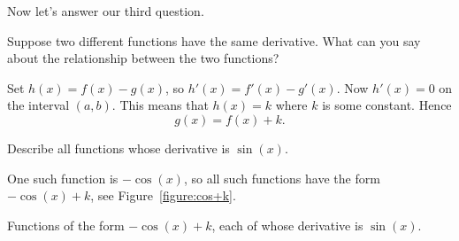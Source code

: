 Now let's answer our third question.

\begin{example}
Suppose two different functions have the same derivative. What can you
say about the relationship between the two functions?
\end{example}

\begin{solution}
Set $h(x) = f(x) - g(x)$, so $h'(x) = f'(x) -g'(x)$. Now $h'(x) = 0$
on the interval $(a,b)$. This means that $h(x) = k$ where $k$ is some
constant. Hence
\[
g(x) = f(x) + k.
\]
\end{solution}


\begin{example}
Describe all functions whose derivative is $\sin(x)$.
\end{example}

\begin{solution}
One such function is $-\cos(x)$, so all such functions have the form
$-\cos(x)+k$, see Figure~\ref{figure:cos+k}.
\end{solution}
\begin{marginfigure}[0in]
\caption{Functions of the form $-\cos(x)+k$, each of whose derivative is $\sin(x)$.}
\label{figure:cos+k}
\end{marginfigure}

